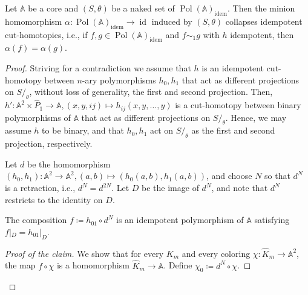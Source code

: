 \documentclass[oneside]{amsart}
\newcommand{\str}[1]{\mathbb{#1}}
\newcommand{\pol}{\operatorname{Pol}}
\newcommand{\idem}{\mathrm{idem}}
\DeclareMathOperator{\id}{id}
\begin{document}
\begin{proposition}
\label{prop:noHomotopies}
    Let $\str A$ be a core and $(S,\theta)$ be a naked set of $\pol(\str A)_\idem$. Then the minion homomorphism $\alpha\colon \pol(\str A)_\idem\to\id$ induced by $(S, \theta)$ collapses idempotent cut-homotopies, i.e., if $f,g\in\pol(\str A)_\idem$ and $f\sim_1 g$ with $h$ idempotent, then $\alpha(f)=\alpha(g)$.
\end{proposition}

\begin{proof}

Striving for a contradiction we assume that $h$ is an idempotent cut-homotopy between $n$-ary polymorphisms $h_0,h_1$ that act as different projections on $S/_\theta$, without loss of generality, the first and second projection. Then, $h' \colon \str A^2 \times \hat P_1 \to \str A, (x,y,ij) \mapsto h_{ij}(x,y,\dots, y)$ is a cut-homotopy between binary polymorphisms of $\str A$ that act as different projections on $S/_\theta$. Hence, we may assume $h$ to be binary, and that $h_0, h_1$ act on $S/_\theta$ as the first and second projection, respectively.



Let $d$ be the homomorphism $(h_0, h_1) \colon \str A^2\to \str A^2, (a,b) \mapsto (h_0(a,b),h_1(a,b))$, and choose $N$ so that $d^N$ is a retraction, i.e., $d^N = d^{2N}$. Let $D$ be the image of $d^N$, and note that $d^N$ restricts to the identity on $D$.

\begin{claim}
The composition $f\coloneq h_{01}\circ d^N$ is an idempotent polymorphism of $\str A$ satisfying $f|_D = h_{01}|_D$.
\end{claim}
\begin{proof}[Proof of the claim]
We show that for every $K_m$ and every coloring $\chi\colon \hat K_m\to \str A^2$, 
the map $f \circ \chi$ is a homomorphism $\hat K_m \to \str A$.
Define $\chi_0\coloneq d^N\circ \chi$.


\end{proof}
\end{proof}
\end{document}
